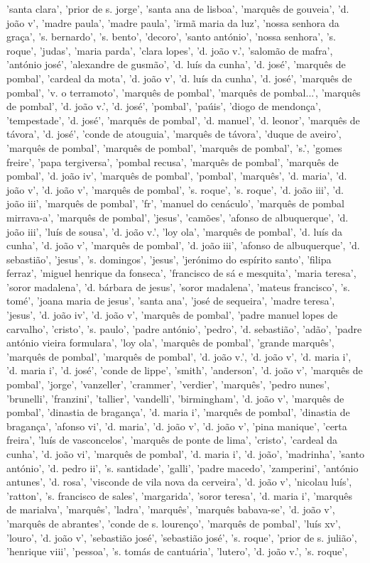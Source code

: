 \documentclass{article}
\begin{document}
\begin{itemize}
'santa clara', 'prior de s. jorge', 'santa ana de lisboa', 'marquês de gouveia', 'd. joão v', 'madre paula', 'madre paula', 'irmã maria da luz', 'nossa senhora da graça', 's. bernardo', 's. bento', 'decoro', 'santo antónio', 'nossa senhora', 's. roque', 'judas', 'maria parda', 'clara lopes', 'd. joão v.', 'salomão de mafra', 'antónio josé', 'alexandre de gusmão', 'd. luís da cunha', 'd. josé', 'marquês de pombal', 'cardeal da mota', 'd. joão v', 'd. luís da cunha', 'd. josé', 'marquês de pombal', 'v. o terramoto', 'marquês de pombal', 'marquês de pombal...', 'marquês de pombal', 'd. joão v.', 'd. josé', 'pombal', 'paúis', 'diogo de mendonça', 'tempestade', 'd. josé', 'marquês de pombal', 'd. manuel', 'd. leonor', 'marquês de távora', 'd. josé', 'conde de atouguia', 'marquês de távora', 'duque de aveiro', 'marquês de pombal', 'marquês de pombal', 'marquês de pombal', 's.', 'gomes freire', 'papa tergiversa', 'pombal recusa', 'marquês de pombal', 'marquês de pombal', 'd. joão iv', 'marquês de pombal', 'pombal', 'marquês', 'd. maria', 'd. joão v', 'd. joão v', 'marquês de pombal', 's. roque', 's. roque', 'd. joão iii', 'd. joão iii', 'marquês de pombal', 'fr', 'manuel do cenáculo', 'marquês de pombal mirrava-a', 'marquês de pombal', 'jesus', 'camões', 'afonso de albuquerque', 'd. joão iii', 'luís de sousa', 'd. joão v.', 'loy ola', 'marquês de pombal', 'd. luís da cunha', 'd. joão v', 'marquês de pombal', 'd. joão iii', 'afonso de albuquerque', 'd. sebastião', 'jesus', 's. domingos', 'jesus', 'jerónimo do espírito santo', 'filipa ferraz', 'miguel henrique da fonseca', 'francisco de sá e mesquita', 'maria teresa', 'soror madalena', 'd. bárbara de jesus', 'soror madalena', 'mateus francisco', 's. tomé', 'joana maria de jesus', 'santa ana', 'josé de sequeira', 'madre teresa', 'jesus', 'd. joão iv', 'd. joão v', 'marquês de pombal', 'padre manuel lopes de carvalho', 'cristo', 's. paulo', 'padre antónio', 'pedro', 'd. sebastião', 'adão', 'padre antónio vieira formulara', 'loy ola', 'marquês de pombal', 'grande marquês', 'marquês de pombal', 'marquês de pombal', 'd. joão v.', 'd. joão v', 'd. maria i', 'd. maria i', 'd. josé', 'conde de lippe', 'smith', 'anderson', 'd. joão v', 'marquês de pombal', 'jorge', 'vanzeller', 'crammer', 'verdier', 'marquês', 'pedro nunes', 'brunelli', 'franzini', 'tallier', 'vandelli', 'birmingham', 'd. joão v', 'marquês de pombal', 'dinastia de bragança', 'd. maria i', 'marquês de pombal', 'dinastia de bragança', 'afonso vi', 'd. maria', 'd. joão v', 'd. joão v', 'pina manique', 'certa freira', 'luís de vasconcelos', 'marquês de ponte de lima', 'cristo', 'cardeal da cunha', 'd. joão vi', 'marquês de pombal', 'd. maria i', 'd. joão', 'madrinha', 'santo antónio', 'd. pedro ii', 's. santidade', 'galli', 'padre macedo', 'zamperini', 'antónio antunes', 'd. rosa', 'visconde de vila nova da cerveira', 'd. joão v', 'nicolau luís', 'ratton', 's. francisco de sales', 'margarida', 'soror teresa', 'd. maria i', 'marquês de marialva', 'marquês', 'ladra', 'marquês', 'marquês babava-se', 'd. joão v', 'marquês de abrantes', 'conde de s. lourenço', 'marquês de pombal', 'luís xv', 'louro', 'd. joão v', 'sebastião josé', 'sebastião josé', 's. roque', 'prior de s. julião', 'henrique viii', 'pessoa', 's. tomás de cantuária', 'lutero', 'd. joão v.', 's. roque', 
\end{itemize}
\end{document}
